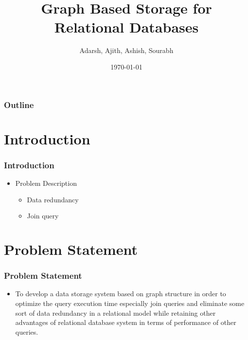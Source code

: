 \documentclass[14pt,xcolor=dvipsnames]{beamer}
\title{Graph Based Storage for Relational Databases}
\author{Adarsh, Ajith, Ashish, Sourabh}
\date{\today}
\begin{document}
\begin{frame}
\titlepage
\end{frame}


\begin{frame}
\frametitle{Outline}
\begin{multicols}{2}
\tableofcontents[hideallsubsections]
\end{multicols}
\end{frame}

\section{Introduction}
\begin{frame}
\frametitle{Introduction}
\begin{itemize} 
 \item Problem Description
  \begin{itemize}
    \item Data redundancy
    \item Join query
  \end{itemize}
\end{itemize}
\end{frame}

\section{Problem Statement}
\begin{frame}
\frametitle{Problem Statement}
\begin{itemize}
  \item To develop a data storage system based on graph structure in order to optimize the query execution time especially join queries and eliminate some sort of data redundancy in a relational model while retaining other advantages of relational database system in terms of performance of other queries.
\end{itemize}
\end{frame}
\end{document}
